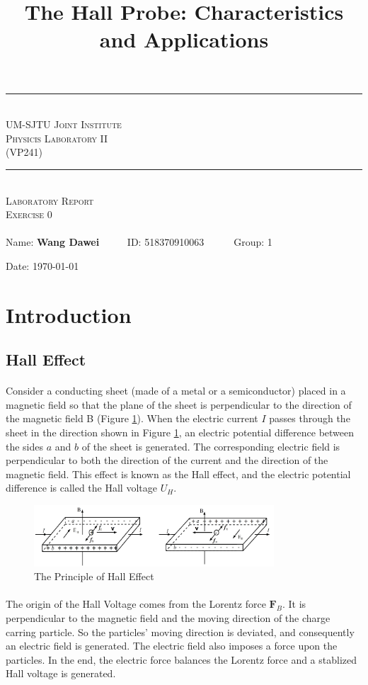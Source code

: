\documentclass[a4paper]{article}
\title{The Hall Probe: Characteristics and Applications}
\makeatletter
\def\@Exercisenum{0}
\def\@group{1}
\newif\iffellowornot\fellowornotfalse
\newcommand{\HRule}{\rule{\linewidth}{0.5mm}}
\renewcommand{\maketitle}{
	\begin{titlepage}
	\begin{center}
	\HRule \\[0.8cm]
	\textsc {UM-SJTU Joint Institute \\ Physicis Laboratory II\\(VP241)}\\[0.5cm]
	\HRule \\
	\vfill
	\textsc {Laboratory Report} \\[1.5cm]
	\textsc {Exercise \@Exercisenum} \\[0.8cm]
	\textsc \@title \\ 
	\vfill
	Name: \textbf {Wang Dawei} \ \ \ \ \ ID: 518370910063\ \ \ \ \ \ Group: \@group   
	\iffellowornot
	\\ Name: \@fellowname\ \ \ \ ID: \@fellowID\ \ \ \ \ \ Group: \@group
	\fi
	
	Date: \today 
	\newpage
	\end{center}
	\end{titlepage}
}
\makeatother
\begin{document}
    \maketitle
    \section{Introduction}
    \subsection{Hall Effect}
    \paragraph{} Consider a conducting sheet (made of a metal or a semiconductor) placed in a magnetic field so that the plane of the sheet is perpendicular to the direction of the magnetic field B (Figure \ref{fig:halleffect}). When the electric current $I$ passes through the sheet in the direction shown in Figure \ref{fig:halleffect}, an electric potential difference between the sides $a$ and $b$ of the sheet is generated. The corresponding electric field is perpendicular to both the direction of the current and the direction of the magnetic field. This effect is known as the Hall effect, and the electric potential difference is called the Hall voltage $U_H$.
    \begin{figure}[H]
        \centering
        \includegraphics[width=0.8\textwidth]{fig/halleffect.png}
        \caption{The Principle of Hall Effect}
        \label{fig:halleffect}
    \end{figure}
    \paragraph{} The origin of the Hall Voltage comes from the Lorentz force $\textbf{F}_B$. It is perpendicular to the magnetic field and the moving direction of the charge carring particle. So the particles' moving direction is deviated, and consequently an electric field is generated. The electric field also imposes a force upon the particles. In the end, the electric force balances the Lorentz force and a stablized Hall voltage is generated.
    \vspace{-5mm}
\end{document}
